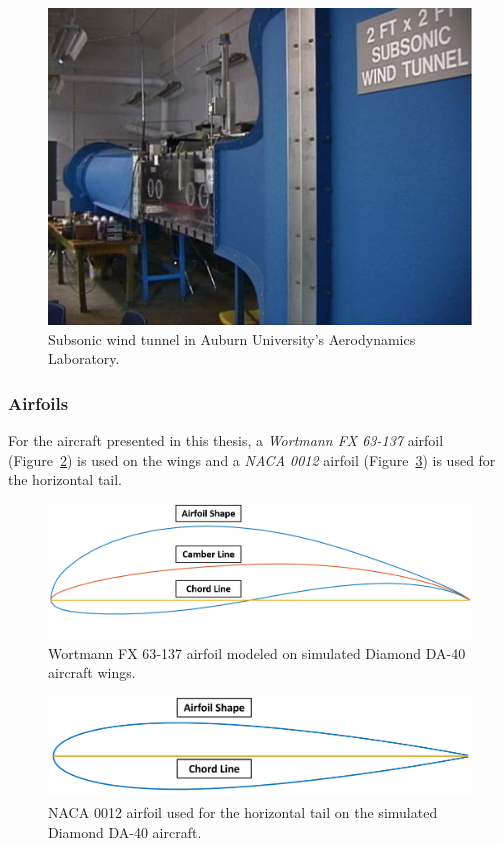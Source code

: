 \documentclass[12pt]{report}
\begin{document}
\begin{figure}[!ht]\label{fig:windtunnel}
  \centering
  \includegraphics[width=.75\linewidth]{Figures/opencircuitwindtunnel.jpg}
  \caption{Subsonic wind tunnel in Auburn University's Aerodynamics Laboratory.}
\end{figure}

\subsubsection{Airfoils}
For the aircraft presented in this thesis, a \textit{Wortmann FX 63{-}137} airfoil (Figure~\ref{fig:airfoil}) is used on the wings and a \textit{NACA 0012} airfoil (Figure~\ref{fig:naca0012}) is used for the horizontal tail.

\begin{figure}[!ht]\label{fig:airfoil}
  \centering
  \includegraphics[width=\linewidth]{Figures/da40airfoil.png}
  \caption{Wortmann FX 63{-}137 airfoil modeled on simulated Diamond DA-40 aircraft wings.}
\end{figure}

\begin{figure}[!ht]\label{fig:naca0012}
  \centering
  \includegraphics[width=\linewidth]{Figures/naca0012.png}
  \caption{NACA 0012 airfoil used for the horizontal tail on the simulated Diamond DA-40 aircraft.}
\end{figure}
\end{document}
